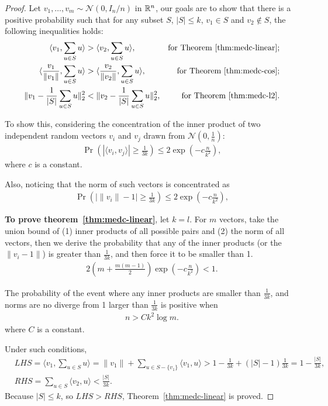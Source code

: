 \begin{proof}
Let $v_1, \dots, v_m \sim \mathcal{N}(0, I_n/n)$ in $\mathbb{R}^n$, our goals are to show that there is a positive probability such that 
for any subset $S$, $|S|\leq k$, $v_1\in S$ and $v_2\notin S$, the following inequalities holds:
\begin{align}
    \langle v_1, \sum_{u\in S} u \rangle & > \langle v_2 ,  \sum_{u\in S} u \rangle, & \text{for Theorem~\ref{thm:medc-linear}};\\
    \langle \frac{v_1}{\|v_1\|}, \sum_{u\in S} u \rangle & > \langle \frac{v_2}{\|v_2\|},  \sum_{u\in S} u \rangle, &\text{for Theorem~\ref{thm:medc-cos}};\\
    \|v_1 - \frac{1}{|S|} \sum_{u\in S} u \|_2^2 &< \|v_2 - \frac{1}{|S|} \sum_{u\in S} u \|_2^2, & \text{for Theorem~\ref{thm:medc-l2}}.
\end{align}

To show this, considering the concentration of the inner product of two independent random vectors $v_i$ and $v_j$ drawn from $\mathcal{N}(0, \frac{1}{n})$:
\begin{align}
\Pr\left(|\langle v_i, v_j\rangle| \geq \frac{1}{3k} \right) \leq 2\exp\left(-c\frac{n}{k^2}\right),
\end{align}
where $c$ is a constant.

Also, noticing that the norm of such vectors is concentrated as
\begin{align}
\Pr\left(|\|v_i\| - 1| \geq \frac{1}{3k} \right) \leq 2\exp\left(-c\frac{n}{k^2}\right),
\end{align}

\textbf{To prove theorem~\ref{thm:medc-linear}}, let $k=l$.
For $m$ vectors, take the union bound of (1) inner products of all possible pairs and (2) the norm of all vectors, then we derive the probability that any of the inner products (or the $\|v_i - 1\|$) is greater than $\frac{1}{3k}$, and then force it to be smaller than 1.
\begin{align}
	2 \left(m+\frac{m(m-1)}{2}\right) \exp\left(-c\frac{n}{k^2}\right) < 1.
\end{align}

The probability of the event where any inner products are smaller than $\frac{1}{3k}$, and norms are no diverge from 1 larger than $\frac{1}{3k}$ is positive when
\begin{align}
	n > C k^2 \log m.
\end{align}
where $C$ is a constant.

Under such conditions, 
\begin{align}
    &LHS = \langle v_1, \sum_{u\in S} u \rangle = \|v_1\| + \sum_{u\in S-\{v_1\}} \langle v_1, u\rangle > 1 - \frac{1}{3k} + (|S|-1) \frac{1}{3k} = 1 - \frac{|S|}{3k}, \\
    &RHS = \sum_{u\in S} \langle v_2, u\rangle < \frac{|S|}{3k}.
\end{align}
Because $|S| \leq k$, so $LHS > RHS$, Theorem~\ref{thm:medc-linear} is proved.


\end{proof}
